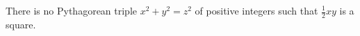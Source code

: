 There is no Pythagorean triple $x^2 + y^2 = z^2$ of positive integers such that $\frac{1}{2}xy$ is a square.
